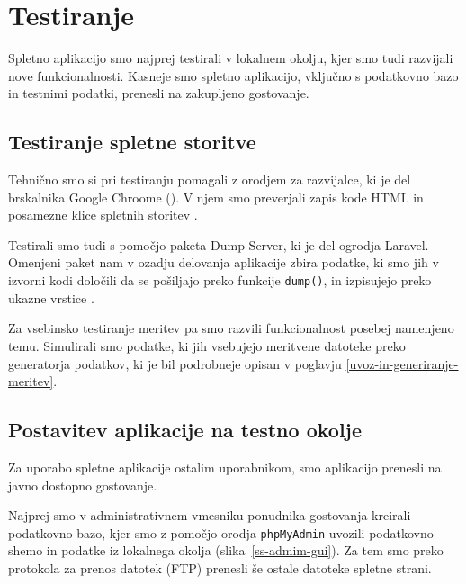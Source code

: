 \documentclass[a4paper, 12pt]{book}
\begin{document}
\chapter{Testiranje}
\label{testiranje}

Spletno aplikacijo smo najprej testirali v lokalnem okolju, kjer smo tudi razvijali nove funkcionalnosti. Kasneje smo spletno aplikacijo, vključno s podatkovno bazo in testnimi podatki, prenesli na zakupljeno gostovanje.

\section{Testiranje spletne storitve}

Tehnično smo si pri testiranju pomagali z orodjem za razvijalce, ki je del brskalnika Google Chroome (). V njem smo preverjali zapis kode HTML in posamezne klice spletnih storitev \cite{google-devtools}.

Testirali smo tudi s pomočjo paketa Dump Server, ki je del ogrodja Laravel. Omenjeni paket nam v ozadju delovanja aplikacije zbira podatke, ki smo jih v izvorni kodi določili da se pošiljajo preko funkcije \verb=dump()=, in izpisujejo preko ukazne vrstice \cite{laravel-dump}.

Za vsebinsko testiranje meritev pa smo razvili funkcionalnost posebej namenjeno temu. Simulirali smo podatke, ki jih vsebujejo meritvene datoteke preko generatorja podatkov, ki je bil podrobneje opisan v poglavju \ref{uvoz-in-generiranje-meritev}.


\section{Postavitev aplikacije na testno okolje}

Za uporabo spletne aplikacije ostalim uporabnikom, smo aplikacijo prenesli na javno dostopno gostovanje. 

Najprej smo v administrativnem vmesniku ponudnika gostovanja kreirali podatkovno bazo, kjer smo z pomočjo orodja \verb=phpMyAdmin= \cite{phpmyadmin-framework} uvozili podatkovno shemo in podatke iz lokalnega okolja (slika~\ref{ss-admim-gui}). Za tem smo preko protokola za prenos datotek (FTP) prenesli še ostale datoteke spletne strani.
\end{document}
